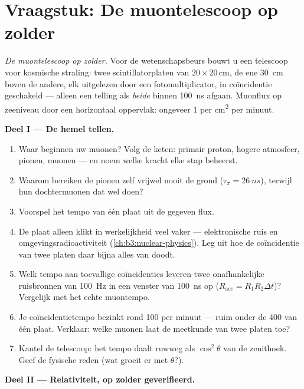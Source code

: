 \section{Vraagstuk: De muontelescoop op zolder}

\begin{problem}\label{pb:b3:particle-physics:1}
\emph{De muontelescoop op zolder.} Voor de wetenschapsbeurs bouwt u een
telescoop voor kosmische straling: twee scintillatorplaten van $20\times20$\,\unit{cm},
de ene \qty{30}{cm} boven de andere, elk uitgelezen door een fotomultiplicator,
in coïncidentie geschakeld --- alleen een telling als \emph{beide}
binnen \qty{100}{ns} afgaan. Muonflux op zeeniveau door een horizontaal
oppervlak: ongeveer 1 per \unit{cm^2} per minuut.

\medskip\noindent\textbf{Deel I --- De hemel tellen.}

\begin{enumerate}
  \item Waar beginnen uw muonen? Volg de keten: primair
        proton, hogere atmosfeer, pionen, muonen --- en noem welke
        kracht elke stap beheerst.
  \item Waarom bereiken de pionen zelf vrijwel nooit de
        grond ($\tau_\pi = \qty{26}{ns}$), terwijl hun dochtermuonen
        dat wel doen?
  \item Voorspel het tempo van één plaat uit de gegeven flux.
  \item De plaat alleen klikt in werkelijkheid veel vaker ---
        elektronische ruis en omgevingsradioactiviteit
        (\cref{ch:b3:nuclear-physics}). Leg uit hoe de
        coïncidentie van twee platen daar bijna alles van doodt.
  \item Welk tempo aan toevallige coïncidenties leveren twee onafhankelijke
        ruisbronnen van \qty{100}{Hz} in een venster van \qty{100}{ns}
        op ($R_{\text{acc}} = R_1R_2\Delta t$)? Vergelijk met
        het echte muontempo.
  \item Je coïncidentietempo bezinkt rond 100 per minuut ---
        ruim onder de 400 van één plaat. Verklaar: welke muonen
        laat de meetkunde van twee platen toe?
  \item Kantel de telescoop: het tempo daalt ruwweg als
        $\cos^2\theta$ van de zenithoek. Geef de fysische
        reden (wat groeit er met $\theta$?).
\end{enumerate}

\medskip\noindent\textbf{Deel II --- Relativiteit, op zolder geverifieerd.}


\end{problem}
